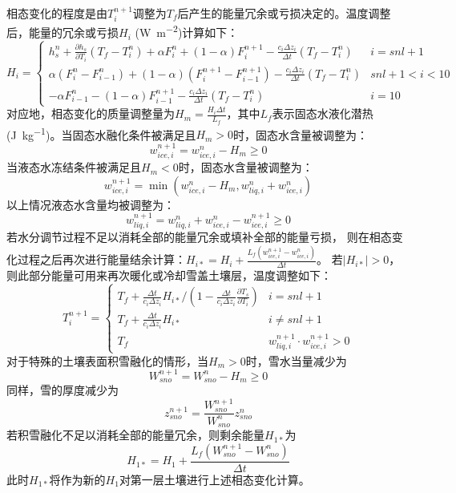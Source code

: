 相态变化的程度是由$T_i^{n+1}$调整为$T_f$后产生的能量冗余或亏损决定的。温度调整后，能量的冗余或亏损$H_i$ (\unit{W.m^{-2}})计算如下：
\begin{equation}
H_{i}=\begin{cases}
h_{s}^{n}+\frac{\partial h_{s}}{\partial T_{i}}\left(T_{f}-T_{i}^{n}\right)+\alpha F_{i}^{n}+(1-\alpha) F_{i}^{n+1}-\frac{c_{i} \Delta z_{i}}{\Delta t}\left(T_{f}-T_{i}^{n}\right) & i=snl+1 \\
\alpha\left(F_{i}^{n}-F_{i-1}^{n}\right)+(1-\alpha)\left(F_{i}^{n+1}-F_{i-1}^{n+1}\right)-\frac{c_{i} \Delta z_{i}}{\Delta t}\left(T_{f}-T_{i}^{n}\right) & snl+1<i<10 \\
-\alpha F_{i-1}^{n}-(1-\alpha) F_{i-1}^{n+1}-\frac{c_{i} \Delta z_{i}}{\Delta t}\left(T_{f}-T_{i}^{n}\right) & i=10
\end{cases}
\end{equation}
对应地，相态变化的质量调整量为$H_{m}=\frac{H_{i} \Delta t}{L_{f}}$，其中$L_f$表示固态水液化潜热(\unit{J.kg^{-1}})。当固态水融化条件被满足且$H_m>0$时，固态水含量被调整为：
\begin{equation}
w_{ice, i}^{n+1}=w_{ice, i}^{n}-H_{m} \geqslant 0
\end{equation}
当液态水冻结条件被满足且$H_m<0$时，固态水含量被调整为：
\begin{equation}
w_{ice, i}^{n+1}=\min{\left(w_{ice, i}^{n}-H_{m}, w_{liq, i}^{n}+w_{ice, i}^{n}\right)}
\end{equation}
以上情况液态水含量均被调整为：
\begin{equation}
w_{liq, i}^{n+1}=w_{liq, i}^{n}+w_{ice, i}^{n}-w_{ice, i}^{n+1} \geqslant 0
\end{equation}
若水分调节过程不足以消耗全部的能量冗余或填补全部的能量亏损，
则在相态变化过程之后再次进行能量结余计算：$ H_{i *}=H_{i}+\frac{L_{f}\left(w_{ice, i}^{n+1}-w_{ice, i}^{n}\right)}{\Delta t}$。
若$\left|H_{i\ast}\right|>0$，则此部分能量可用来再次暖化或冷却雪盖土壤层，温度调整如下：
\begin{equation}
T_{i}^{n+1}=\left\{\begin{array}{lr}T_{f}+\frac{\Delta t}{c_{i} \Delta z_{i}} H_{i *} /\left(1-\frac{\Delta t}{c_{i} \Delta z_{i}} \frac{\partial T_{s}}{\partial T_{i}}\right) & i=s n l+1 \\ T_{f}+\frac{\Delta t}{c_{i} \Delta z_{i}} H_{i *} & i \neq s n l+1 \\ T_{f} & w_{liq, i}^{n+1} \cdot w_{ice, i}^{n+1}>0\end{array}\right.
\end{equation}
对于特殊的土壤表面积雪融化的情形，当$H_m>0$时，雪水当量减少为
\begin{equation}
W_{sno}^{n+1}=W_{s no}^{n}-H_{m} \geqslant 0
\end{equation}
同样，雪的厚度减少为
\begin{equation}
z_{sno}^{n+1}=\frac{W_{sno}^{n+1}}{W_{sno}^{n}} z_{sno}^{n}
\end{equation}
若积雪融化不足以消耗全部的能量冗余，则剩余能量$H_{1\ast}$为
\begin{equation}
H_{1 *}=H_{1}+\frac{L_{f}\left(W_{sno}^{n+1}-W_{sno}^{n}\right)}{\Delta t}
\end{equation}
此时$H_{1\ast}$将作为新的$H_1$对第一层土壤进行上述相态变化计算。


